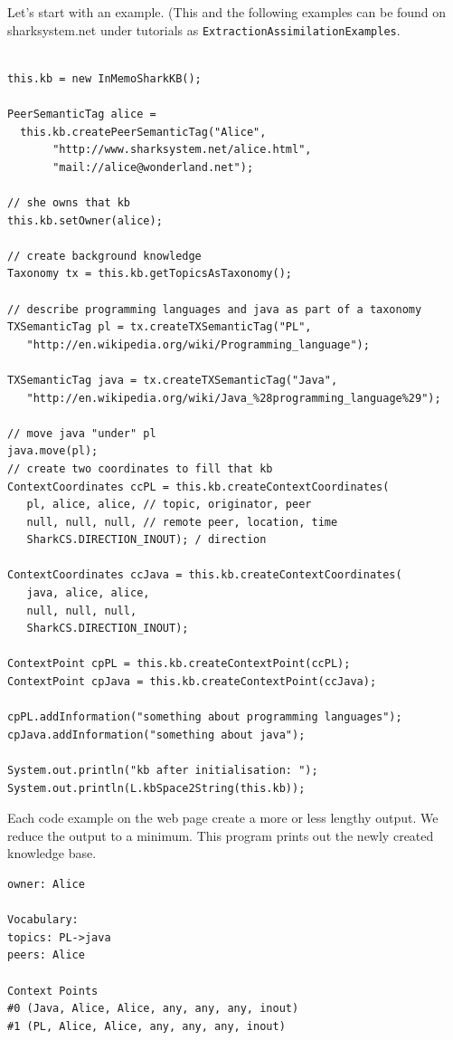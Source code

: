 Let's start with an example. (This and the following examples can be found on sharksystem.net under tutorials as {\tt ExtractionAssimilationExamples}.

\begin{verbatim}

this.kb = new InMemoSharkKB();

PeerSemanticTag alice = 
  this.kb.createPeerSemanticTag("Alice", 
       "http://www.sharksystem.net/alice.html", 
       "mail://alice@wonderland.net");

// she owns that kb
this.kb.setOwner(alice);

// create background knowledge
Taxonomy tx = this.kb.getTopicsAsTaxonomy();

// describe programming languages and java as part of a taxonomy
TXSemanticTag pl = tx.createTXSemanticTag("PL",
   "http://en.wikipedia.org/wiki/Programming_language");

TXSemanticTag java = tx.createTXSemanticTag("Java", 
   "http://en.wikipedia.org/wiki/Java_%28programming_language%29");

// move java "under" pl
java.move(pl);
// create two coordinates to fill that kb
ContextCoordinates ccPL = this.kb.createContextCoordinates(
   pl, alice, alice, // topic, originator, peer
   null, null, null, // remote peer, location, time
   SharkCS.DIRECTION_INOUT); / direction

ContextCoordinates ccJava = this.kb.createContextCoordinates(
   java, alice, alice, 
   null, null, null, 
   SharkCS.DIRECTION_INOUT);

ContextPoint cpPL = this.kb.createContextPoint(ccPL);
ContextPoint cpJava = this.kb.createContextPoint(ccJava);

cpPL.addInformation("something about programming languages");
cpJava.addInformation("something about java");

System.out.println("kb after initialisation: ");
System.out.println(L.kbSpace2String(this.kb));
\end{verbatim}

Each code example on the web page create a more or less lengthy output. We reduce the output to a minimum. This program prints out the newly created knowledge base.

\begin{verbatim}
owner: Alice

Vocabulary:
topics: PL->java
peers: Alice

Context Points
#0 (Java, Alice, Alice, any, any, any, inout)
#1 (PL, Alice, Alice, any, any, any, inout)
\end{verbatim}

